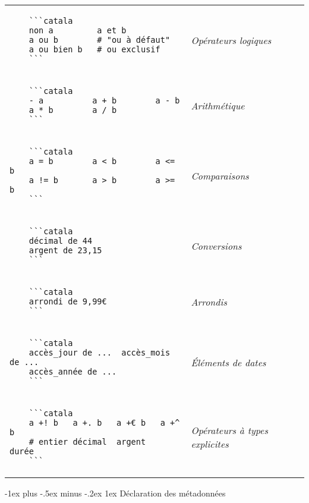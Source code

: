 \documentclass{article}
\makeatletter
\newcommand\articlenormalsize{\fontsize{10pt}{12pt}\selectfont}
\renewcommand{\section}{\@startsection{section}{1}{0mm}%
                                {-1ex plus -.5ex minus -.2ex}%
                                {1ex}%
                                {\normalfont\articlenormalsize\bfseries}}
\newenvironment{catala}{%
  \VerbatimEnvironment
  \let\FV@ListVSpace\relax
  \begin{verbatim}}%
 {\end{verbatim}}
\makeatother
\begin{document}
\begin{multicols}{3}
\begin{tabular}{@{}p{\cola}>{\slshape}p{\colb}@{}}
  \begin{catala}
    ```catala
    non a         a et b
    a ou b        # "ou à défaut"
    a ou bien b   # ou exclusif
    ```
  \end{catala}
  & Opérateurs logiques
  \\
  \begin{catala}
    ```catala
    - a          a + b        a - b
    a * b        a / b
    ```
  \end{catala}
  & Arithmétique
  \\
  \begin{catala}
    ```catala
    a = b        a < b        a <= b
    a != b       a > b        a >= b
    ```
  \end{catala}
  & Comparaisons
  \\
  \begin{catala}
    ```catala
    décimal de 44
    argent de 23,15
    ```
  \end{catala}
  & Conversions
  \\
  \begin{catala}
    ```catala
    arrondi de 9,99€
    ```
  \end{catala}
  & Arrondis
  \\
  \begin{catala}
    ```catala
    accès_jour de ...  accès_mois de ...
    accès_année de ...
    ```
  \end{catala}
  & Éléments de dates
  \\
  \begin{catala}
    ```catala
    a +! b   a +. b   a +€ b   a +^ b
    # entier décimal  argent   durée
    ```
  \end{catala}
  & Opérateurs à types explicites
  \\
\end{tabular}

\section{Déclaration des métadonnées}

\begin{tabular}{@{}p{\cola}>{\slshape}p{\colb}@{}}


\end{tabular}
\end{multicols}
\end{document}
